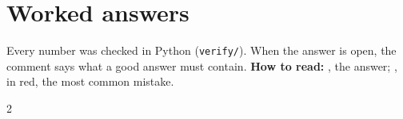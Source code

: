\documentclass[11pt,a4paper]{article}
\begin{document}
\clearpage
\gdef\currentactivity{Worked answers}
\section*{\sffamily Worked answers}

{\small Every number was checked in Python (\texttt{verify/}). When the answer is open, the comment says what a good answer must contain. \textbf{How to read:} , the answer; , in red, the most common mistake.}

\begin{multicols}{2}
\small\raggedright
\setlength{\parskip}{.25em}


















\end{multicols}
\end{document}
